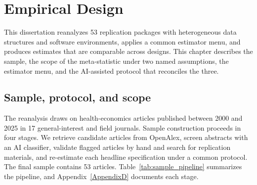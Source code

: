 \chapter{Empirical Design}
\label{Chapter3}

This dissertation reanalyzes 53 replication packages with heterogeneous data structures and software environments, applies a common estimator menu, and produces estimates that are comparable across designs. This chapter describes the sample, the scope of the meta-statistic under two named assumptions, the estimator menu, and the AI-assisted protocol that reconciles the three.

\section{Sample, protocol, and scope}

The reanalysis draws on health-economics articles published between 2000 and 2025 in 17 general-interest and field journals. Sample construction proceeds in four stages. We retrieve candidate articles from OpenAlex, screen abstracts with an AI classifier, validate flagged articles by hand and search for replication materials, and re-estimate each headline specification under a common protocol. The final sample contains 53 articles. Table~\ref{tab:sample_pipeline} summarizes the pipeline, and Appendix~\ref{AppendixD} documents each stage.

